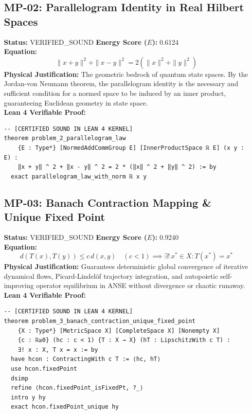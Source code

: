 \documentclass[11pt, a4paper]{article}
\begin{document}
\subsection{MP-02: Parallelogram Identity in Real Hilbert Spaces}
\textbf{Status:} VERIFIED\_SOUND \hfill \textbf{Energy Score ($E$):} 0.6124\\
\textbf{Equation:}
\begin{equation*}
\|x + y\|^2 + \|x - y\|^2 = 2(\|x\|^2 + \|y\|^2)
\end{equation*}
\textbf{Physical Justification:} The geometric bedrock of quantum state spaces. By the Jordan-von Neumann theorem, the parallelogram identity is the necessary and sufficient condition for a normed space to be induced by an inner product, guaranteeing Euclidean geometry in state space.\\
\textbf{Lean 4 Verifiable Proof:}
\begin{verbatim}
-- [CERTIFIED SOUND IN LEAN 4 KERNEL]
theorem problem_2_parallelogram_law
    {E : Type*} [NormedAddCommGroup E] [InnerProductSpace ℝ E] (x y : E) :
    ‖x + y‖ ^ 2 + ‖x - y‖ ^ 2 = 2 * (‖x‖ ^ 2 + ‖y‖ ^ 2) := by
  exact parallelogram_law_with_norm ℝ x y

\end{verbatim}

\subsection{MP-03: Banach Contraction Mapping \& Unique Fixed Point}
\textbf{Status:} VERIFIED\_SOUND \hfill \textbf{Energy Score ($E$):} 0.9240\\
\textbf{Equation:}
\begin{equation*}
d(T(x), T(y)) \le c\, d(x, y) \quad (c < 1) \implies \exists!\, x^* \in X: T(x^*) = x^*
\end{equation*}
\textbf{Physical Justification:} Guarantees deterministic global convergence of iterative dynamical flows, Picard-Lindelöf trajectory integration, and autopoietic self-improving operator equilibrium in ANSE without divergence or chaotic runaway.\\
\textbf{Lean 4 Verifiable Proof:}
\begin{verbatim}
-- [CERTIFIED SOUND IN LEAN 4 KERNEL]
theorem problem_3_banach_contraction_unique_fixed_point
    {X : Type*} [MetricSpace X] [CompleteSpace X] [Nonempty X]
    {c : ℝ≥0} (hc : c < 1) {T : X → X} (hT : LipschitzWith c T) :
    ∃! x : X, T x = x := by
  have hcon : ContractingWith c T := ⟨hc, hT⟩
  use hcon.fixedPoint
  dsimp
  refine ⟨hcon.fixedPoint_isFixedPt, ?_⟩
  intro y hy
  exact hcon.fixedPoint_unique hy

\end{verbatim}
\end{document}
